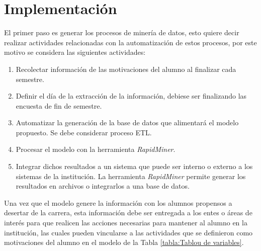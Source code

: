 \section{Implementación}

El primer paso es generar los procesos de minería de datos, esto quiere decir realizar actividades relacionadas con la automatización de estos procesos, por este motivo se considera las siguientes actividades:

\begin{enumerate}
	\item Recolectar información de las motivaciones del alumno al finalizar cada semestre.
	\item Definir el día de la extracción de la información, debiese ser finalizando las encuesta de fin de semestre.
	\item Automatizar la generación de la base de datos que alimentará el modelo propuesto. Se debe considerar proceso ETL.
	\item Procesar el modelo con la herramienta \textit{RapidMiner}.
	\item Integrar dichos resultados a un sistema que puede ser interno o externo a los sistemas de la institución. La herramienta \textit{RapidMiner} permite generar los resultados en archivos o integrarlos a una base de datos.
\end{enumerate}

Una vez que el modelo genere la información con los alumnos propensos a desertar de la carrera, esta información debe ser entregada a los entes o áreas de interés para que realicen las acciones necesarias para mantener al alumno en la institución, las cuales pueden vincularse a las actividades que se definieron como motivaciones del alumno en el modelo de la Tabla \ref{tabla:Tablou de variables}.